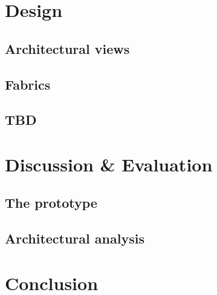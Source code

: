\documentclass{article}
\begin{document}
\section{Design}
\subsection{Architectural views}
\subsection{Fabrics}
\subsection{TBD}
\hspace{1cm}

\section{Discussion \& Evaluation}
\subsection{The prototype}
\subsection{Architectural analysis}
\hspace{1cm}

\section{Conclusion}
\end{document}
